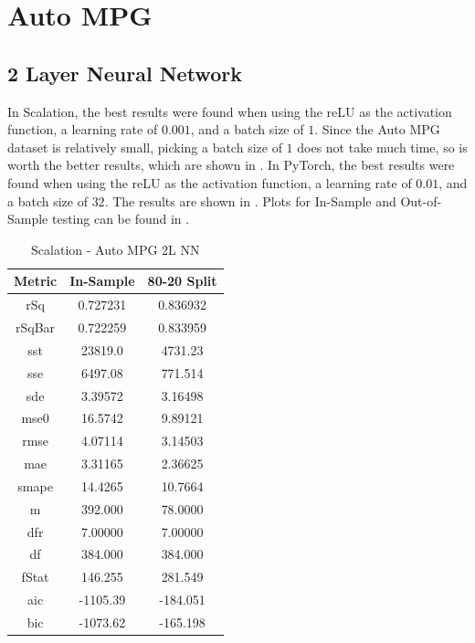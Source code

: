 \documentclass{article}
\begin{document}
\section{Auto MPG}

\subsection{2 Layer Neural Network}

In Scalation, the best results were found when using the reLU as the activation function, a learning rate of $0.001$, and a batch size of $1$. Since the Auto MPG dataset is relatively small, picking a batch size of $1$ does not take much time, so is worth the better results, which are shown in . In PyTorch, the best results were found when using the reLU as the activation function, a learning rate of $0.01$, and a batch size of $32$. The results are shown in . Plots for In-Sample and Out-of-Sample testing can be found in .

\begin{table}[H]
\centering
\caption{Scalation - Auto MPG 2L NN}
\label{tab:Scalation - Auto MPG 2L NN}
\begin{tabular}{|c|c|c|} \hline 
Metric & In-Sample & 80-20 Split \\ \hline \hline 
rSq &0.727231 & 0.836932 \\ \hline 
rSqBar &0.722259 &      0.833959 \\ \hline 
sst &23819.0 &  4731.23 \\ \hline 
sse &6497.08 &  771.514 \\ \hline 
sde &3.39572 &  3.16498 \\ \hline 
mse0 &16.5742 & 9.89121 \\ \hline 
rmse &4.07114 & 3.14503 \\ \hline 
mae &3.31165 &  2.36625 \\ \hline 
smape &14.4265 &        10.7664 \\ \hline 
m &392.000 &    78.0000 \\ \hline 
dfr &7.00000 &  7.00000 \\ \hline 
df &384.000 &   384.000 \\ \hline 
fStat &146.255 &        281.549 \\ \hline 
aic &-1105.39 & -184.051 \\ \hline 
bic &-1073.62 & -165.198 \\ \hline 
\end{tabular}
\end{table}
\end{document}

